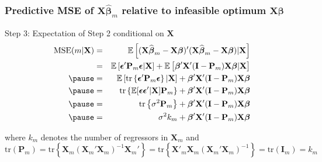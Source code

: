 \begin{frame}
  \frametitle{Predictive MSE of $\mathbf{X}\widehat{\boldsymbol{\beta}}_m$ relative to infeasible optimum $\boldsymbol{X}\boldsymbol{\beta}$}
  \begin{block}{Step 3: Expectation of Step 2 conditional on $\mathbf{X}$}
	\begin{eqnarray*}
    \mbox{MSE}(m|\mathbf{X}) &=& \mathbb{E}\left[(\mathbf{X}\widehat{\boldsymbol{\beta}}_m - \mathbf{X}\boldsymbol{\beta})'(\mathbf{X}\widehat{\boldsymbol{\beta}}_m - \mathbf{X}\boldsymbol{\beta})|\mathbf{X} \right]\\
    &=& \mathbb{E}\left[\boldsymbol{\epsilon}'\mathbf{P}_m \boldsymbol{\epsilon}|\mathbf{X}\right] + \mathbb{E}\left[\boldsymbol{\beta}'\mathbf{X}'(\mathbf{I} - \mathbf{P}_m)\mathbf{X}\boldsymbol{\beta} |\mathbf{X}\right]\\ \pause
    &=&\mathbb{E}\left[\mbox{tr}\left\{\boldsymbol{\epsilon}'\mathbf{P}_m \boldsymbol{\epsilon}\right\}|\mathbf{X}\right] + \boldsymbol{\beta}'\mathbf{X}'(\mathbf{I} - \mathbf{P}_m)\mathbf{X}\boldsymbol{\beta} \\ \pause
    &=&\mbox{tr}\left\{\mathbb{E}[\boldsymbol{\epsilon} \boldsymbol{\epsilon}'|\mathbf{X}]\mathbf{P}_m\right\} + \boldsymbol{\beta}'\mathbf{X}'(\mathbf{I} - \mathbf{P}_m)\mathbf{X}\boldsymbol{\beta} \\ \pause
    &=&\mbox{tr}\left\{\sigma^2 \mathbf{P}_m\right\} + \boldsymbol{\beta}'\mathbf{X}'(\mathbf{I} - \mathbf{P}_m)\mathbf{X}\boldsymbol{\beta} \\ \pause
    &=& \sigma^2 k_m + \boldsymbol{\beta}'\mathbf{X}'(\mathbf{I} - \mathbf{P}_m)\mathbf{X}\boldsymbol{\beta}
	\end{eqnarray*}

  \vspace{1em}
  \small
  \alert{where $k_m$ denotes the number of regressors in $\mathbf{X}_m$ and $\text{tr}(\mathbf{P}_m) = \text{tr}\left\{ \mathbf{X}_m\left( \mathbf{X}_m'\mathbf{X}_m \right)^{-1}\mathbf{X}_m' \right\} = \text{tr}\left\{ \mathbf{X}'_m \mathbf{X}_m \left( \mathbf{X}_m' \mathbf{X}_m \right)^{-1} \right\} = \text{tr}(\mathbf{I}_m) = k_m$}
  \end{block}

\end{frame}
